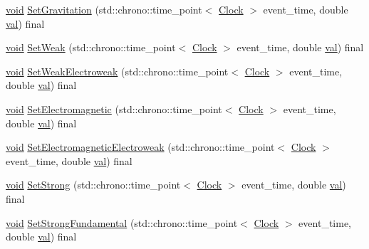 \begin{DoxyCompactItemize}
\item 
\mbox{\hyperlink{glad_8h_a950fc91edb4504f62f1c577bf4727c29}{void}} \mbox{\hyperlink{class_law_a908ccc2b0a561a7324a15393ec157219}{Set\+Gravitation}} (std\+::chrono\+::time\+\_\+point$<$ \mbox{\hyperlink{universe_8h_a0ef8d951d1ca5ab3cfaf7ab4c7a6fd80}{Clock}} $>$ event\+\_\+time, double \mbox{\hyperlink{glad_8h_a26942fd2ed566ef553eae82d2c109c8f}{val}}) final
\item 
\mbox{\hyperlink{glad_8h_a950fc91edb4504f62f1c577bf4727c29}{void}} \mbox{\hyperlink{class_law_a1009b4e0bc0b91f41d48dc137529e97b}{Set\+Weak}} (std\+::chrono\+::time\+\_\+point$<$ \mbox{\hyperlink{universe_8h_a0ef8d951d1ca5ab3cfaf7ab4c7a6fd80}{Clock}} $>$ event\+\_\+time, double \mbox{\hyperlink{glad_8h_a26942fd2ed566ef553eae82d2c109c8f}{val}}) final
\item 
\mbox{\hyperlink{glad_8h_a950fc91edb4504f62f1c577bf4727c29}{void}} \mbox{\hyperlink{class_law_a65e5e757041c1e72bb046eccbb6d66db}{Set\+Weak\+Electroweak}} (std\+::chrono\+::time\+\_\+point$<$ \mbox{\hyperlink{universe_8h_a0ef8d951d1ca5ab3cfaf7ab4c7a6fd80}{Clock}} $>$ event\+\_\+time, double \mbox{\hyperlink{glad_8h_a26942fd2ed566ef553eae82d2c109c8f}{val}}) final
\item 
\mbox{\hyperlink{glad_8h_a950fc91edb4504f62f1c577bf4727c29}{void}} \mbox{\hyperlink{class_law_acabe1a3113c207368f3bb6fe81e13963}{Set\+Electromagnetic}} (std\+::chrono\+::time\+\_\+point$<$ \mbox{\hyperlink{universe_8h_a0ef8d951d1ca5ab3cfaf7ab4c7a6fd80}{Clock}} $>$ event\+\_\+time, double \mbox{\hyperlink{glad_8h_a26942fd2ed566ef553eae82d2c109c8f}{val}}) final
\item 
\mbox{\hyperlink{glad_8h_a950fc91edb4504f62f1c577bf4727c29}{void}} \mbox{\hyperlink{class_law_aca9bb82839ddb46bd89f52b6211c5a54}{Set\+Electromagnetic\+Electroweak}} (std\+::chrono\+::time\+\_\+point$<$ \mbox{\hyperlink{universe_8h_a0ef8d951d1ca5ab3cfaf7ab4c7a6fd80}{Clock}} $>$ event\+\_\+time, double \mbox{\hyperlink{glad_8h_a26942fd2ed566ef553eae82d2c109c8f}{val}}) final
\item 
\mbox{\hyperlink{glad_8h_a950fc91edb4504f62f1c577bf4727c29}{void}} \mbox{\hyperlink{class_law_a4cd0dd1908edbd02090dd1ba1387d722}{Set\+Strong}} (std\+::chrono\+::time\+\_\+point$<$ \mbox{\hyperlink{universe_8h_a0ef8d951d1ca5ab3cfaf7ab4c7a6fd80}{Clock}} $>$ event\+\_\+time, double \mbox{\hyperlink{glad_8h_a26942fd2ed566ef553eae82d2c109c8f}{val}}) final
\item 
\mbox{\hyperlink{glad_8h_a950fc91edb4504f62f1c577bf4727c29}{void}} \mbox{\hyperlink{class_law_a4a7c8caa24acf453c1a8782a1ec4acf4}{Set\+Strong\+Fundamental}} (std\+::chrono\+::time\+\_\+point$<$ \mbox{\hyperlink{universe_8h_a0ef8d951d1ca5ab3cfaf7ab4c7a6fd80}{Clock}} $>$ event\+\_\+time, double \mbox{\hyperlink{glad_8h_a26942fd2ed566ef553eae82d2c109c8f}{val}}) final

\end{DoxyCompactItemize}
